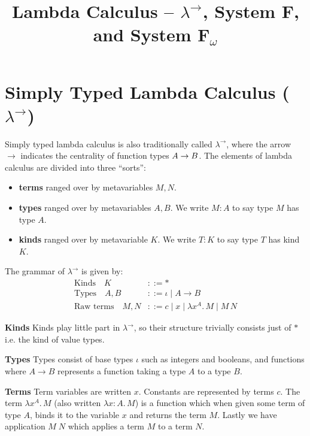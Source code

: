 \documentclass[acmsmall, 9pt]{article}
\begin{document}
\pagestyle{empty}

\title{Lambda Calculus -- $\lambda^{\rightarrow}$, System F, and System F$_\omega$ }

\maketitle

\section{Simply Typed Lambda Calculus ($\lambda^{\rightarrow}$)}
Simply typed lambda calculus \cite{cambridge-lambda-calc} is also traditionally called $\lambda^{\rightarrow}$, where the arrow $\rightarrow$ indicates the centrality of function types ${A}\rightarrow{B}$. The elements of lambda calculus are divided into three ``sorts'':
\begin{itemize}
  \item \textbf{terms} ranged over by metavariables $M, N$.
  \item \textbf{types} ranged over by metavariables $A, B$. We write $M: A$ to say type $M$ has type $A$.
  \item \textbf{kinds} ranged over by metavariable $K$. We write $T : K$ to say type $T$ has kind $K$.
\end{itemize}
\noindent
The grammar of $\lambda^{\rightarrow}$ is given by:
\begin{align*}
  \text{Kinds} \quad K &::= * \\
  \text{Types} \quad  A, B &::= \iota \; | \;  A \rightarrow B  \\
  \text{Raw terms} \quad M, N &::= c \; | \; x \; | \;  \lambda x^A . \, M \; | \; M \, N
\end{align*}

\noindent
\textbf{Kinds} Kinds play little part in $\lambda^{\rightarrow}$, so their structure trivially consists just of $*$ i.e. the kind of value types.

\noindent
\textbf{Types} Types consist of base types $\iota$ such as integers and booleans, and functions where $A \rightarrow B$ represents a function taking a type $A$ to a type $B$.

\noindent
\textbf{Terms} Term variables are written $x$. Constants are represented by terms $c$. The term $\lambda x^A . \, M$ (also written $\lambda x : A . \, M$) is a function which when given some term of type $A$, binds it to the variable $x$ and returns the term $M$. Lastly we have application $M \; N$ which applies a term $M$ to a term $N$.
\end{document}
